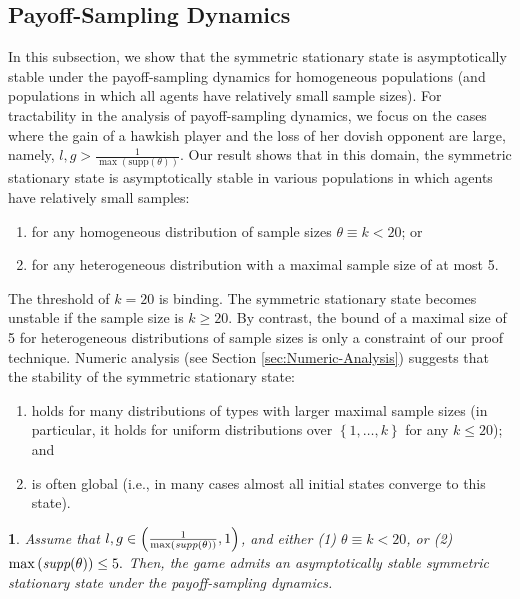 \documentclass[12pt]{article}
\numberwithin{equation}{section}
\numberwithin{figure}{section}
\theoremstyle{definition}
\theoremstyle{plain}
\theoremstyle{plain}
\theoremstyle{plain}
\newtheorem{thm}{\protect\theoremname}
\theoremstyle{remark}
\theoremstyle{plain}
\theoremstyle{plain}
\providecommand{\theoremname}{Theorem}
\begin{document}
\subsection{Payoff-Sampling
Dynamics\label{subsec:Stability-of-symmetric-payoff-dynamics}}
 In this subsection, we show that the symmetric stationary state is asymptotically stable under the payoff-sampling dynamics for homogeneous populations (and populations in which all agents have relatively small sample sizes).  For tractability in the analysis of payoff-sampling dynamics, we focus on the cases where the gain of a hawkish player and the loss of her dovish opponent are large, namely, $l,g>\frac{1}{\max (\textrm{supp}(\theta))}$. Our result shows that in this domain, the symmetric stationary state 
is asymptotically
stable in various populations in which agents have relatively small samples:
\begin{enumerate}
\item for any homogeneous  distribution of sample sizes $\theta\equiv k<20$; or
\item for any heterogeneous distribution with a maximal sample size of at most 5.
\end{enumerate}
The threshold of $k=20$ is binding. The symmetric stationary state becomes unstable if the sample size is $k \geq 20.$ By contrast, the bound of a maximal size of 5 for heterogeneous distributions of sample sizes is only a constraint of our proof technique. Numeric analysis (see Section \ref{sec:Numeric-Analysis}) suggests that the stability of the symmetric stationary state:
\begin{enumerate}
    \item holds for many distributions of types with larger maximal sample sizes (in particular, it holds for uniform distributions over 
$\left\{ 1,\dots,k\right\} $ for any $k\leq20$); and
    \item is often global (i.e., in many cases almost all initial states converge to this state).
\end{enumerate}
\begin{thm}\label{thm:stableinterior_PSD}
Assume that $l,g\in\left(\frac{1}{\max\left(\emph{supp}(\theta\right))},1\right)$, and either (1) $\theta\equiv k<20$, or (2) $\max\left(\emph{supp}(\theta\right))\leq5.$ Then, the game admits an asymptotically stable symmetric stationary state 
under the payoff-sampling dynamics. 
\end{thm}
\end{document}
